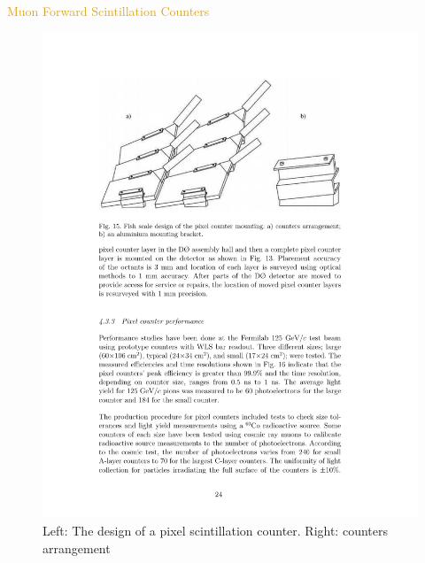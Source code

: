 \begin{frame}{\textcolor{Goldenrod}{Muon Forward Scintillation Counters}}
\begin{overlayarea}{\textwidth}{\textheight}
\begin{figure}[h]
      \includegraphics[height=0.45\textheight]{./Images/47_MD_forward_pixels_03.pdf}
      \caption*{Left: The design of a pixel scintillation counter.
        Right: counters arrangement}
    \end{figure}
    
  \end{overlayarea}
\end{frame}


